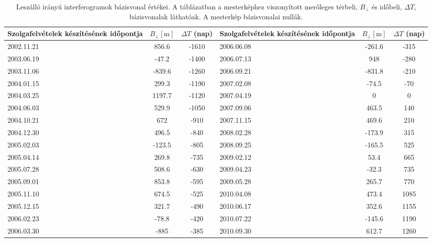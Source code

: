\documentclass[12pt]{report}
\numberwithin{equation}{section}
\numberwithin{table}{section}
\numberwithin{figure}{section}
\begin{document}
\begin{table}[H]
    \begin{center}
        \begin{tabular}{m{3cm} c c || m{3cm} c c} \toprule
            Szolgafelvételek készítésének időpontja & $B_{\perp} [\si{\meter}]$ & $\Delta T$ (nap) & Szolgafelvételek készítésének időpontja & $B_{\perp} [\si{\meter}]$ & $\Delta T$ (nap)\\ \midrule
            2002.11.21 & 856.6 & -1610 & 2006.06.08 & -261.6 & -315 \\
            2003.06.19 & -47.2 & -1400 & 2006.07.13 & 948 & -280 \\
            2003.11.06 & -839.6 & -1260 & 2006.09.21 & -831.8 & -210 \\
            2004.01.15 & 299.3 & -1190 & 2007.02.08 & -74.5 & -70 \\
            2004.03.25 & 1197.7 & -1120 & 2007.04.19 & 0 & 0 \\
            2004.06.03 & 529.9 & -1050 & 2007.09.06 & 463.5 & 140 \\
            2004.10.21 & 672 & -910 & 2007.11.15 & 469.6 & 210 \\
            2004.12.30 & 496.5 & -840 & 2008.02.28 & -173.9 & 315 \\
            2005.02.03 & -123.5 & -805 & 2008.09.25 & -165.5 & 525 \\
            2005.04.14 & 269.8 & -735 & 2009.02.12 & 53.4 & 665 \\
            2005.07.28 & 508.6 & -630 & 2009.04.23 & -32.3 & 735 \\
            2005.09.01 & 853.8 & -595 & 2009.05.28 & 265.7 & 770 \\
            2005.11.10 & 674.5 & -525 & 2010.04.08 & 473.4 & 1085 \\
            2005.12.15 & 321.7 & -490 & 2010.06.17 & 352.6 & 1155 \\
            2006.02.23 & -78.8 & -420 & 2010.07.22 & -145.6 & 1190 \\
            2006.03.30 & -885 & -385 & 2010.09.30 & 612.7 & 1260 \\ \bottomrule
        \end{tabular}
        \caption{Leszálló irányú interferogramok bázisvonal értékei. A táblázatban a mesterképhez viszonyított merőleges térbeli, $B_{\perp}$ és időbeli, $\Delta T$, bázisvonalak láthatóak. A mesterkép bázisvonalai nullák.}\label{psi_dsc}
    \end{center}
\end{table}
\end{document}
